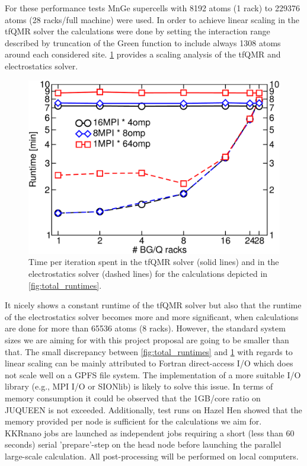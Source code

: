 \documentclass [a4paper, 12pt]{article}
\begin{document}
For these performance tests MnGe supercells
with 8192 atoms (1 rack) to 229376 atoms (28 racks/full machine) were used.
In order to achieve linear scaling in the tfQMR solver the calculations were 
done by setting the interaction range described by truncation of the Green function to include 
always 1308 atoms around each considered site.
\cref{fig:tfqmr_es_times} provides a scaling analysis of the tfQMR and electrostatics solver.
\begin{figure}[h]
\begin{center}
 \includegraphics[scale=0.45]{Figures/combinedtfqmrelectrostatics.pdf}
\end{center}
\caption{Time per iteration spent in the tfQMR solver (solid lines) 
	and in the electrostatics solver (dashed lines) for the calculations depicted in
	\cref{fig:total_runtimes}.}
\label{fig:tfqmr_es_times}
\end{figure}
It nicely shows 
a constant runtime of the tfQMR solver but also that the runtime of the electrostatics solver becomes
more and more significant, when calculations are done for more than 65536 atoms (8 racks). 
However, the standard system sizes we are aiming
for with this project proposal are going to be smaller than that.
The small discrepancy between \cref{fig:total_runtimes} and \cref{fig:tfqmr_es_times} with regards to linear
scaling can be mainly attributed to Fortran direct-access I/O which does not scale well on a GPFS file system.
The implementation of a more suitable I/O library (e.g., MPI I/O or SIONlib) is likely to solve this issue.
In terms of memory consumption it could be observed that the 1GB/core ratio on JUQUEEN is not exceeded.
Additionally, test runs on Hazel Hen showed that the memory provided per node is sufficient for the calculations
we aim for.
\\
KKRnano jobs are launched as independent jobs requiring a short (less than 60 seconds) serial 'prepare'-step on
the head node
before launching the parallel large-scale calculation. All post-processing will be
performed on local computers.
\end{document}
